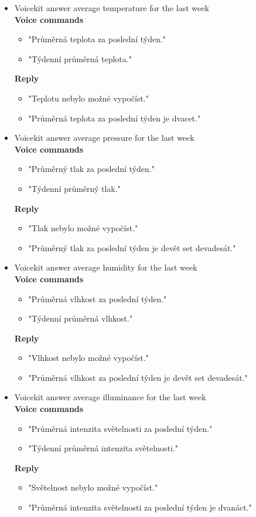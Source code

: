 \begin{itemize}
    \item Voicekit answer average temperature for the last week\\
    \textbf{Voice commands}
    \begin{itemize}
        \item "Průměrná teplota za poslední týden."
        \item "Týdenní průměrná teplota."
    \end{itemize}
    \textbf{Reply}
    \begin{itemize}
        \item "Teplotu nebylo možné vypočíst."
        \item "Průměrná teplota za poslední týden je dvacet."
    \end{itemize}
    \item Voicekit answer average pressure for the last week\\
    \textbf{Voice commands}
    \begin{itemize}
        \item "Průměrný tlak za poslední týden."
        \item "Týdenní průměrný tlak."
    \end{itemize}
    \textbf{Reply}
    \begin{itemize}
        \item "Tlak nebylo možné vypočíst."
        \item "Průměrný tlak za poslední týden je devět set devadesát."
    \end{itemize}
    \item Voicekit answer average humidity for the last week\\
    \textbf{Voice commands}
    \begin{itemize}
        \item "Průměrná vlhkost za poslední týden."
        \item "Týdenní průměrná vlhkost."
    \end{itemize}
    \textbf{Reply}
    \begin{itemize}
        \item "Vlhkost nebylo možné vypočíst."
        \item "Průměrná vlhkost za poslední týden je devět set devadesát."
    \end{itemize}
    \item Voicekit answer average illuminance for the last week\\
    \textbf{Voice commands}
    \begin{itemize}
        \item "Průměrná intenzita světelnosti za poslední týden."
        \item "Týdenní průměrná intenzita světelnosti."
    \end{itemize}
    \textbf{Reply}
    \begin{itemize}
        \item "Světelnost nebylo možné vypočíst."
        \item "Průměrná intenzita světelnosti za poslední týden je dvanáct."
    \end{itemize}
\end{itemize}

